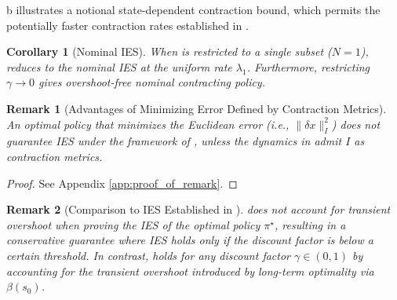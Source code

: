 \documentclass[lettersize,journal]{IEEEtran}
\newtheorem{remark}{Remark}
\newtheorem{corollary}{Corollary}
\begin{document}
b illustrates a notional state-dependent contraction bound, which permits the potentially faster contraction rates established in .




\begin{corollary}[Nominal IES]\label{rem:nominal_recovery}
When  is restricted to a single subset ($N = 1$),  reduces to the nominal IES at the uniform rate $\lambda_1$. 
Furthermore, restricting $\gamma \rightarrow 0$ gives overshoot-free nominal contracting policy.
\end{corollary}



\begin{remark}[Advantages of Minimizing Error Defined by Contraction Metrics]\label{remark:advantages_of_Riemannian_energy}
    An optimal policy that minimizes the Euclidean error (i.e., $\| \delta x \|_I^2$) does not guarantee IES under the framework of , unless the dynamics in  admit $I$ as contraction metrics.
\end{remark}
\begin{proof}
    See Appendix \ref{app:proof_of_remark}.
\end{proof}


\begin{remark}[Comparison to IES Established in \cite{11664333}]
    \cite{11664333} does not account for transient overshoot when proving the IES of the optimal policy $\pi^\star$, resulting in a conservative guarantee where IES holds only if the discount factor is below a certain threshold. 
    In contrast,  holds for any discount factor $\gamma \in (0, 1)$ by accounting for the transient overshoot introduced by long-term optimality via $\beta(s_0)$.
\end{remark}
\end{document}
